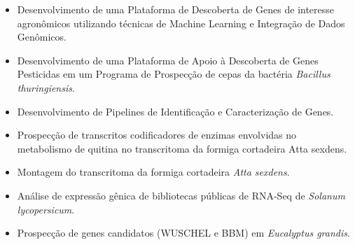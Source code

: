 \documentclass[10pt,a4paper,ragged2e]{altacv}
\begin{document}

\begin{fullwidth}
\makecvheader
\end{fullwidth}




\begin{itemize}
    \item Desenvolvimento de uma Plataforma de Descoberta de Genes de interesse agronômicos utilizando técnicas de Machine Learning e Integração de Dados Genômicos.
    \item Desenvolvimento de uma Plataforma de Apoio à Descoberta de Genes Pesticidas em um Programa de Prospecção de cepas da bactéria \textit{Bacillus thuringiensis}.
    \item Desenvolvimento de Pipelines de Identificação e Caracterização de Genes.
    \item Prospecção de transcritos codificadores de enzimas envolvidas no metabolismo de quitina no transcritoma da formiga cortadeira Atta sexdens.
    \item Montagem do transcritoma da formiga cortadeira \textit{Atta sexdens}.
    \item Análise de expressão gênica de bibliotecas públicas de RNA-Seq de \textit{Solanum lycopersicum}.
    \item Prospecção de genes candidatos (WUSCHEL e BBM) em \textit{Eucalyptus grandis}.
\end{itemize}
\end{document}
